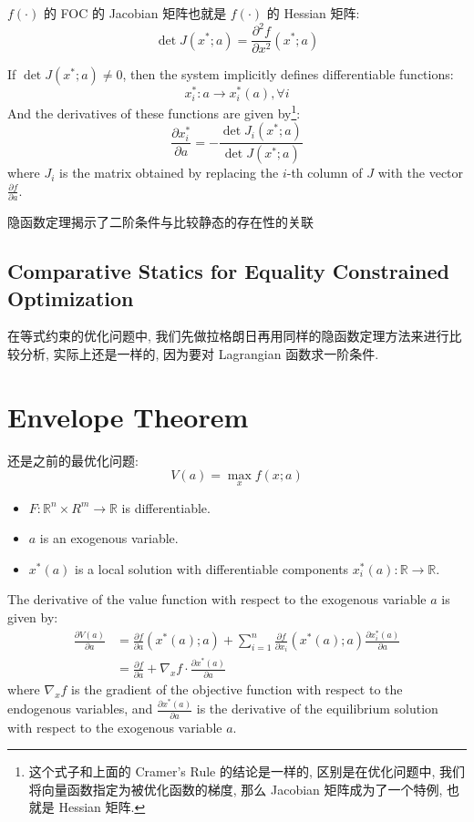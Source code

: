 $f(\cdot)$ 的 FOC 的 Jacobian 矩阵也就是 $f(\cdot)$ 的 Hessian 矩阵:
$$\det J(x^*;a) = \frac{\partial^2 f}{\partial x^2} (x^*;a)$$

\begin{proposition}
    If $\det J(x^*;a) \neq 0$, then the system implicitly defines differentiable functions:
    $$ x^*_i : a \to x^*_i(a) , \forall i$$
    And the derivatives of these functions are given by\footnote{这个式子和上面的 Cramer's Rule 的结论是一样的, 区别是在优化问题中, 我们将向量函数指定为被优化函数的梯度, 那么 Jacobian 矩阵成为了一个特例, 也就是 Hessian 矩阵.}:
    $$ \frac{\partial x^*_i}{\partial a} = -\frac{\det J_{i}(x^*;a)}{\det J(x^*;a)} $$
    where $J_{i}$ is the matrix obtained by replacing the $i$-th column of $J$ with the vector $\frac{\partial f}{\partial a}$.
\end{proposition}
\begin{note}
    隐函数定理揭示了二阶条件与比较静态的存在性的关联
\end{note}
\subsection{Comparative Statics for Equality Constrained Optimization}
在等式约束的优化问题中, 我们先做拉格朗日再用同样的隐函数定理方法来进行比较分析, 实际上还是一样的, 因为要对 Lagrangian 函数求一阶条件.
\section{Envelope Theorem}
还是之前的最优化问题:
$$ V(a) = \max_{x} f(x;a) $$
\begin{itemize}
    \item $F : \mathbb{R}^n \times R^m \to \mathbb{R}$ is differentiable.
    \item $a$ is an exogenous variable.
    \item $x^*(a)$ is a local solution with differentiable components $x^*_i(a) : \mathbb{R} \to \mathbb{R}$.
\end{itemize}

\begin{theorem}
    The derivative of the value function with respect to the exogenous variable $a$ is given by:
    $$ \begin{aligned}\frac{\partial V(a)}{\partial a} &= \frac{\partial f}{\partial a} (x^*(a);a) + \sum_{i=1}^{n} \frac{\partial f}{\partial x_i} (x^*(a);a) \frac{\partial x^*_i(a)}{\partial a} \\ &=  \frac{\partial f}{\partial a} + \nabla_x f \cdot \frac{\partial x^*(a)}{\partial a} \end{aligned} $$
    where $\nabla_x f$ is the gradient of the objective function with respect to the endogenous variables, and $\frac{\partial x^*(a)}{\partial a}$ is the derivative of the equilibrium solution with respect to the exogenous variable $a$.

\end{theorem}

%







